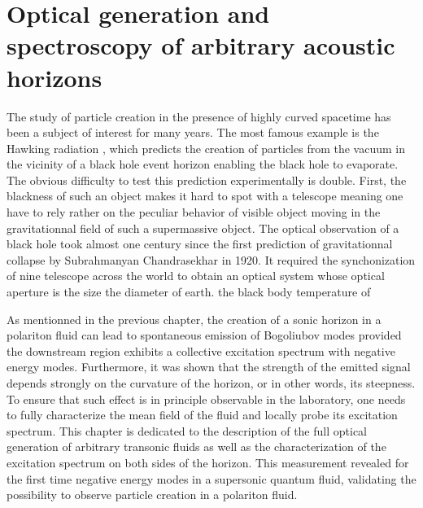 

\setcounter{topnumber}{2}
\setcounter{bottomnumber}{0}
\setcounter{totalnumber}{2}
\renewcommand{\topfraction}{0.99}
\renewcommand{\textfraction}{0.01}
\renewcommand{\floatpagefraction}{0.8}

\graphicspath{{./}{./fig/}{./chap_custom_st/fig/}}

\chapter{Optical generation and spectroscopy of arbitrary acoustic horizons}

\label{chap:generation_transonic_fluid}

The study of particle creation in the presence of highly curved spacetime has been a subject of interest for many years. The most famous example is the Hawking radiation \cite{hawking_black_1972}, which predicts the creation of particles from the vacuum in the vicinity of a black hole event horizon enabling the black hole 
to evaporate. The obvious difficulty to test this prediction experimentally is double. First, the blackness of such an object makes it hard to spot with a telescope meaning one have to rely rather on the peculiar behavior of visible object moving in the gravitationnal field of such a supermassive object. The optical observation of a black hole took almost one century since the first prediction of gravitationnal collapse by Subrahmanyan Chandrasekhar in 1920. It required 
the synchonization of nine telescope across the world to obtain an optical system whose optical aperture is the size the diameter of earth. the black body temperature of 

As mentionned in the previous chapter, the creation of a sonic horizon in a polariton fluid can lead to spontaneous emission of Bogoliubov modes provided the downstream region exhibits a collective excitation spectrum with
 negative energy modes. Furthermore, it was shown that the strength of the emitted signal depends strongly on the curvature of the horizon, or in other words, its steepness. To ensure that such effect is in principle observable in the laboratory, one needs to fully characterize the mean field of the fluid and locally probe its excitation spectrum. This chapter is dedicated to the description of the full optical generation of arbitrary transonic fluids as well as the characterization of the excitation spectrum on both sides of the horizon. 
This measurement revealed for the first time negative energy modes in a supersonic quantum fluid, validating the possibility to observe particle creation in a polariton fluid.

